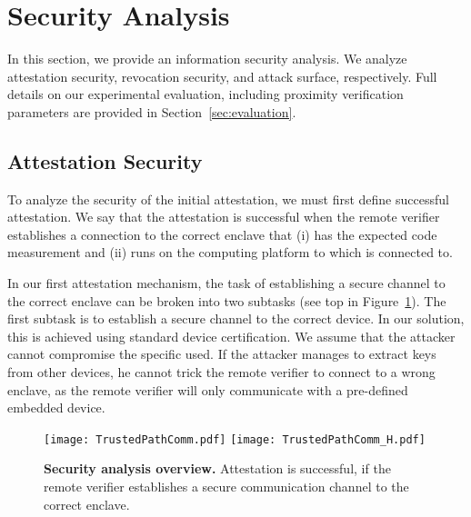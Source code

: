 
\section{Security Analysis}
\label{sec:analysis}

In this section, we provide an information security analysis. We analyze attestation security, revocation security, and attack surface, respectively. Full details on our experimental evaluation, including proximity verification parameters are provided in Section~\ref{sec:evaluation}.

\subsection{Attestation Security}

To analyze the security of the initial attestation, we must first define successful attestation. We say that the attestation is successful when the remote verifier establishes a connection to the correct enclave that (i) has the expected code measurement and (ii) runs on the computing platform to which \device is connected to.

\ifusenix
\vspace{-10pt}
\else
\fi
{} In our first attestation mechanism, the task of establishing a secure channel to the correct enclave can be broken into two subtasks (see top in Figure~\ref{fig:trustedPathCommunication}). The first subtask is to establish a secure channel to the correct \device device. In our solution, this is achieved using standard device certification. We assume that the attacker cannot compromise the specific \device used. If the attacker manages to extract keys from other \device devices, he cannot trick the remote verifier to connect to a wrong enclave, as the remote verifier will only communicate with a pre-defined embedded device.

\begin{figure}[t]
 \centering
  \ifusenix
  \texttt{[image: TrustedPathComm.pdf]}
  \else
  \texttt{[image: TrustedPathComm\_H.pdf]}
  \fi 
 \caption{\textbf{Security analysis overview.} Attestation is successful, if the remote verifier establishes a secure communication channel to the correct enclave.}
 \ifusenix
 \vspace{-15pt}
 \else
 \fi
 \label{fig:trustedPathCommunication}
\end{figure}

